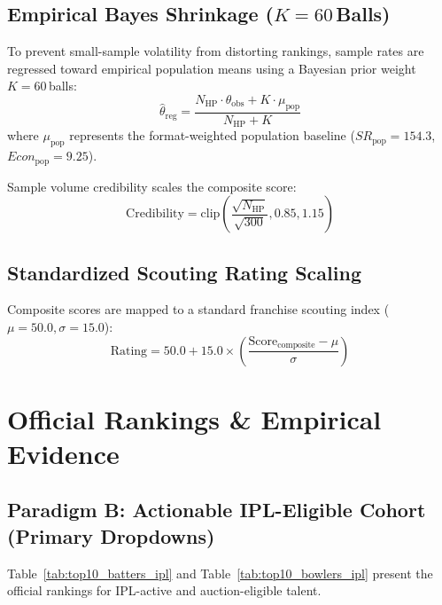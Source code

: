 \documentclass[11pt,a4paper]{article}
\begin{document}
\subsection{Empirical Bayes Shrinkage ($K = 60$\,Balls)}
To prevent small-sample volatility from distorting rankings, sample rates are regressed toward empirical population means using a Bayesian prior weight $K = 60$\,balls:
\begin{equation}
\widehat{\theta}_{\text{reg}} = \frac{N_{\text{HP}} \cdot \theta_{\text{obs}} + K \cdot \mu_{\text{pop}}}{N_{\text{HP}} + K}
\end{equation}
where $\mu_{\text{pop}}$ represents the format-weighted population baseline ($SR_{\text{pop}} = 154.3$, $Econ_{\text{pop}} = 9.25$).

Sample volume credibility scales the composite score:
\begin{equation}
\text{Credibility} = \text{clip}\left( \frac{\sqrt{N_{\text{HP}}}}{\sqrt{300}}, 0.85, 1.15 \right)
\end{equation}

\subsection{Standardized Scouting Rating Scaling}
Composite scores are mapped to a standard franchise scouting index ($\mu = 50.0, \sigma = 15.0$):
\begin{equation}
\text{Rating} = 50.0 + 15.0 \times \left( \frac{\text{Score}_{\text{composite}} - \mu}{\sigma} \right)
\end{equation}

\newpage

\section{Official Rankings \& Empirical Evidence}

\subsection{Paradigm B: Actionable IPL-Eligible Cohort (Primary Dropdowns)}
Table~\ref{tab:top10_batters_ipl} and Table~\ref{tab:top10_bowlers_ipl} present the official rankings for IPL-active and auction-eligible talent.
\end{document}
